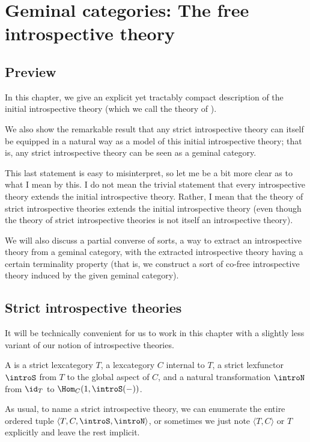 \filestart

\section{Geminal categories: The free introspective theory}\label{GeminalChapter}
\subsection{Preview}
In this chapter, we give an explicit yet tractably compact description of the initial introspective theory (which we call the theory of ).

We also show the remarkable result that any strict introspective theory can itself be equipped in a natural way as a model of this initial introspective theory; that is, any strict introspective theory can be seen as a geminal category.

This last statement is easy to misinterpret, so let me be a bit more clear as to what I mean by this. I do not mean the trivial statement that every introspective theory extends the initial introspective theory. Rather, I mean that the theory of strict introspective theories extends the initial introspective theory (even though the theory of strict introspective theories is not itself an introspective theory).

We will also discuss a partial converse of sorts, a way to extract an introspective theory from a geminal category, with the extracted introspective theory having a certain terminality property (that is, we construct a sort of co-free introspective theory induced by the given geminal category).

\subsection{Strict introspective theories}
It will be technically convenient for us to work in this chapter with a slightly less  variant of our notion of introspective theories.

\begin{definition}\label{StrictIntrospDefn}
A  is a strict lexcategory $T$, a lexcategory $C$ internal to $T$, a strict lexfunctor $\introS$ from $T$ to the global aspect of $C$, and a natural transformation $\introN$ from $\id_T$ to $\Hom_C(1, \introS(-))$.
\end{definition}

As usual, to name a strict introspective theory, we can enumerate the entire ordered tuple $\langle T, C, \introS, \introN \rangle$, or sometimes we just note $\langle T, C \rangle$ or $T$ explicitly and leave the rest implicit.

